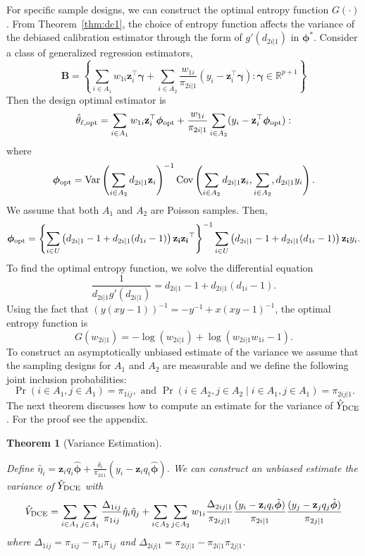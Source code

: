 \documentclass[12pt]{article}
\newtheorem{theorem}{Theorem}
\newcommand{\Cov}{{\text{Cov}}}
\newcommand{\Var}{{\text{Var}}}
\newcommand{\R}{\mathbb{R}}
\renewcommand{\bf}[1]{\mathbf{#1}}
\begin{document}
For specific sample designs, we can construct the optimal entropy function
$G(\cdot)$. From Theorem~\ref{thm:dc1}, the choice of entropy function affects
the variance of the debiased calibration estimator through the form of $g'(d_{2i|1})$
in $\bm \phi^*$. Consider a class of generalized regression estimators,
$$
\mathbf{B} = 
\left\{\sum_{i \in A_1} w_{1i} \bf{z}_i^\top \bm \gamma + 
\sum_{i \in A_2} \frac{w_{1i}}{\pi_{2i|1}}(y_i - \bf{z}_i^\top \bm \gamma):
\bm \gamma \in \R^{p+1}\right\}
$$
Then the design optimal estimator is 
$$
\hat \theta_{\ell, \rm{opt}} = 
\sum_{i \in A_1} w_{1i} \bf{z}_i^\top \bm \phi_{\rm opt} + 
\frac{w_{1i}}{\pi_{2i|1}}\sum_{i \in A_2} (y_i - \bf{z}_i^\top \bm \phi_{\rm opt}):
$$
where 
$$
\bm \phi_{\rm opt} = 
\Var\left(\sum_{i \in A_2} d_{2i|1} \bf{z}_i\right)^{-1} 
\Cov\left(\sum_{i \in A_2} d_{2i|1} \bf{z}_i, \sum_{i \in A_2}, d_{2i|1} y_i \right).
$$
We assume that both $A_1$ and $A_2$ are Poisson samples. Then,
$$
\bm \phi_{\rm opt} = 
\left\{
\sum_{i \in U} \left(d_{2i|1} - 1 + d_{2i|1}(d_{1i} - 1)\right) \bf{z_i}\bf{z_i}^\top
\right\}^{-1}
\sum_{i \in U} \left(d_{2i|1} - 1 + d_{2i|1}(d_{1i} - 1)\right) \bf{z_i} y_i.
$$
To find the optimal entropy function, we solve the differential equation
$$
\frac{1}{d_{2i|1} g'(d_{2i|1})} = d_{2i|1} - 1 + d_{2i|1}(d_{1i} - 1).
$$
Using the fact that $(y(xy-1))^{-1} = -y^{-1} + x(xy-1)^{-1}$, the optimal
entropy function is 
$$
G(w_{2i|1}) = - \log(w_{2i|1}) + \log(w_{2i|1}w_{1i} - 1).
$$
To construct an asymptotically unbiased estimate of the variance we assume that
the sampling designs for $A_1$ and $A_2$ are measurable and we define the
following joint inclusion probabilities:
$$
\Pr(i \in A_1, j \in A_1) = \pi_{1ij}, \text{ and }
\Pr(i \in A_2, j \in A_2 \mid i \in A_1, j \in A_1) = \pi_{2ij|1}.
$$
The next theorem discusses how to compute an estimate for the variance of 
$\hat Y_{\rm DCE}$. For the proof see the appendix.

\begin{theorem}[Variance Estimation]\label{thm:mainvar}

  Define $\hat \eta_i = \bf z_i q_i \hat{\bm \phi} + 
  \frac{\delta_i}{\pi_{2i|1}}(y_i - \bf z_i q_i \hat{\bm \phi})$.
  We can construct an unbiased estimate the variance of $\hat Y_{\rm DCE}$ with
  $$
  \hat V_{\rm DCE} 
  = \sum_{i \in A_1} \sum_{j \in A_1} \frac{\Delta_{1ij}}{\pi_{1ij}} 
  \hat \eta_i \hat \eta_j
  + \sum_{i \in A_2} \sum_{j \in A_2} w_{1i} \frac{\Delta_{2ij|1}}{\pi_{2ij|1}} 
  \frac{(y_i - \bf z_i q_i \hat{\bm \phi})}{\pi_{2i|1}}
  \frac{(y_j - \bf z_j q_j \hat{\bm \phi})}{\pi_{2j|1}}
  $$
  where $\Delta_{1ij} = \pi_{1ij} - \pi_{1i}\pi_{1j}$ and 
  $\Delta_{2ij|1} = \pi_{2ij|1} - \pi_{2i|1}\pi_{2j|1}$.
\end{theorem}
\end{document}
